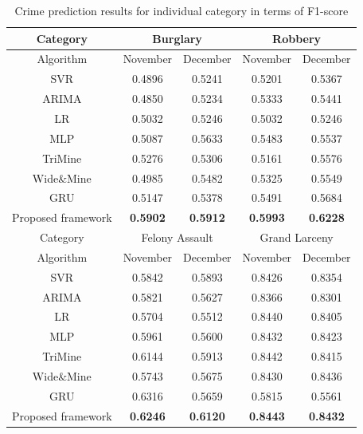 \begin{table}
\centering
\begin{tabular}{c|c|c|c|c}
\toprule
Category
 &\multicolumn{2}{|c|}{Burglary}
&
\multicolumn{2}{|c}{Robbery}\\[0.1cm]
\hline
Algorithm & November & December    & November & December \\[0.1cm]
\hline
SVR & 0.4896 & 0.5241 & 0.5201 & 0.5367\\[0.1cm]
ARIMA & 0.4850 & 0.5234 & 0.5333 & 0.5441\\[0.1cm]
LR & 0.5032 & 0.5246 & 0.5032 & 0.5246\\[0.1cm]
MLP & 0.5087 & 0.5633 & 0.5483 & 0.5537\\[0.1cm]
TriMine & 0.5276 & 0.5306 & 0.5161 & 0.5576 \\[0.1cm]
Wide\&Mine & 0.4985 & 0.5482 & 0.5325 & 0.5549\\[0.1cm]
GRU & 0.5147 & 0.5378 & 0.5491 & 0.5684 \\[0.1cm]
\toprule
Proposed framework & \bf0.5902 & \bf0.5912 & \bf0.5993 & \bf0.6228\\
\bottomrule
\toprule
Category
 &\multicolumn{2}{|c|}{Felony Assault}
&
\multicolumn{2}{|c}{Grand Larceny}\\[0.1cm]
\hline
Algorithm & November & December    & November & December \\[0.1cm]
\hline
SVR & 0.5842 & 0.5893 & 0.8426 & 0.8354\\[0.1cm]
ARIMA & 0.5821 & 0.5627 & 0.8366 & 0.8301\\[0.1cm]
LR & 0.5704 & 0.5512 & 0.8440 & 0.8405\\[0.1cm]
MLP & 0.5961 & 0.5600 & 0.8432 & 0.8423\\[0.1cm]
TriMine & 0.6144 & 0.5913 & 0.8442 & 0.8415 \\[0.1cm]
Wide\&Mine & 0.5743 & 0.5675 & 0.8430 & 0.8436 \\[0.1cm]
GRU & 0.6316 & 0.5659 & 0.5815 & 0.5561 \\[0.1cm]
\toprule
Proposed framework & \textbf{0.6246} & \textbf{0.6120} & \textbf{0.8443} & \textbf{0.8432}\\
\bottomrule
\end{tabular}
\vspace{0.2cm}
\caption{Crime prediction results for individual category in terms of F1-score}
\label{table:category}
\end{table}
